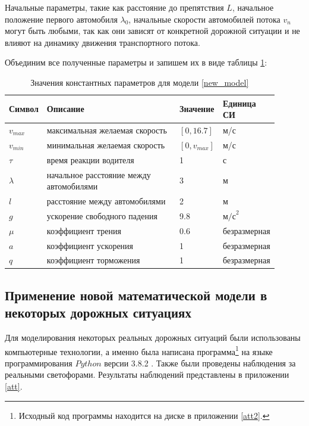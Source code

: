 \documentclass[12pt, a4paper]{extarticle}
\numberwithin{equation}{section}
\numberwithin{figure}{section}
\begin{document}
Начальные параметры, такие как расстояние до препятствия $L$, начальное положение первого автомобиля $\lambda_0$, начальные скорости автомобилей потока $v_n$ могут быть любыми, так как они зависят от конкретной дорожной ситуации и не влияют на динамику движения транспортного потока.

Объединим все полученные параметры и запишем их в виде таблицы \ref{real_parameters}:
\begin{table}[h!]
	\caption{Значения константных параметров для модели \eqref{new_model} }
	\label{real_parameters}
	\begin{center}
		\begin{tabularx}{\textwidth}{p{0.12\linewidth}p{0.52\linewidth}p{0.11\linewidth}p{0.15\linewidth}}			
			\hline
			\rule{0cm}{0,5cm}
			Символ & Описание & Значение & Единица СИ \\
			[3pt]\hline
			$v_{max}$ & максимальная желаемая скорость& $[0,16.7]$&м/с\\
			$v_{min}$ & минимальная желаемая скорость& $[0,v_{max}]$&м/с\\ 
			$\tau$ & время реакции водителя& 1&с\\
			$\lambda$ & начальное расстояние между автомобилями& 3&м\\
			$l$ & расстояние между автомобилями& 2&м\\
			$g$ & ускорение свободного падения& 9.8&$\text{м/с}^2$\\ 
			$\mu$ & коэффициент трения& 0.6& безразмерная\\ 
			$a$ & коэффициент ускорения& 1& безразмерная\\
			$q$ & коэффициент торможения& 1& безразмерная\\
			\hline
		\end{tabularx}
	\end{center}
\end{table}
\newline 

\subsection{Применение новой математической модели в некоторых дорожных ситуациях}

Для моделирования некоторых реальных дорожных ситуаций были использованы компьютерные технологии, а именно была написана программа\footnote{Исходный код программы находится на диске в приложении \ref{att2}.} на языке программирования $Python$ версии 3.8.2 \cite{Python}. Также были проведены наблюдения за реальными светофорами. Результаты наблюдений представлены в приложении \ref{att}.
\end{document}
